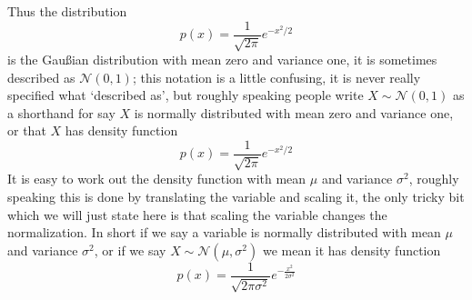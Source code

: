 \documentclass[11pt,a4paper]{scrartcl}
\begin{document}
Thus the distribution 
\begin{equation}
p(x)=\frac{1}{\sqrt{2\pi}}e^{-x^2/2}
\end{equation}
is the Gau\ss{}ian distribution with mean zero and variance one, it is
sometimes described as $\mathcal{N}(0,1)$; this notation is a little
confusing, it is never really specified what \lq{}described as\rq{},
but roughly speaking people write $X\sim \mathcal{N}(0,1)$ as a
shorthand for say $X$ is normally distributed with mean zero and variance one, or that $X$ has density function
\begin{equation}
p(x)=\frac{1}{\sqrt{2\pi}}e^{-x^2/2}
\end{equation}
It is easy to work out the density function with mean $\mu$ and
variance $\sigma^2$, roughly speaking this is done by translating the
variable and scaling it, the only tricky bit which we will just state
here is that scaling the variable changes the normalization. In short
if we say a variable is normally distributed with mean $\mu$ and
variance $\sigma^2$, or if we say $X\sim \mathcal{N}(\mu,\sigma^2)$
we mean it has density function
\begin{equation}
p(x)=\frac{1}{\sqrt{2\pi\sigma^2}}e^{-\frac{x^2}{2\sigma^2}}
\end{equation}
\end{document}
